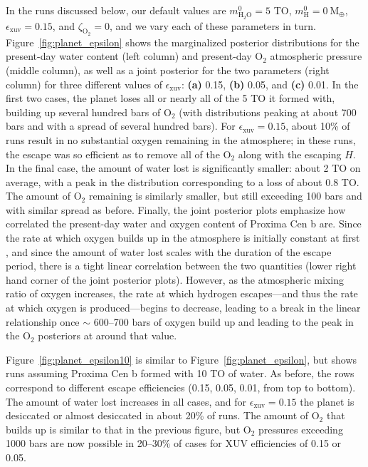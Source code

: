 \documentclass[]{emulateapj}
\begin{document}
In the runs discussed below, our default values are $m_\mathrm{H_2O}^0 = 5$ TO, $m_\mathrm{H}^0 = 0\ \mathrm{M_\oplus}$,
$\epsilon_\mathrm{xuv} = 0.15$, and $\zeta_\mathrm{O_2} = 0$, and we vary each of these parameters in turn. 
Figure~\ref{fig:planet_epsilon} shows the marginalized posterior distributions for the present-day water content (left column)
and present-day O$_2$ atmospheric pressure (middle column), as well as a joint posterior for the two parameters (right column)
for three different values of $\epsilon_\mathrm{xuv}$: \textbf{(a)} 0.15, \textbf{(b)} 0.05, and \textbf{(c)} 0.01. In the first
two cases, the planet loses all or nearly all of the 5 TO it formed with, building up several hundred bars of O$_2$ (with
distributions peaking at about 700 bars and with a spread of several hundred bars). For $\epsilon_\mathrm{xuv} = 0.15$, about
10\% of runs result in no substantial oxygen remaining in the atmosphere; in these runs, the escape was so efficient as to
remove all of the O$_2$ along with the escaping $H$. In the final case, the amount of water lost is significantly smaller:
about 2 TO on average, with a peak in the distribution corresponding to a loss of about 0.8 TO. The amount of O$_2$
remaining is similarly smaller, but still exceeding 100 bars and with similar spread as before. Finally, the joint posterior
plots emphasize how correlated the present-day water and oxygen content of Proxima Cen b are. Since the rate at which
oxygen builds up in the atmosphere is initially constant at first \citep{LugerBarnes15}, and since the amount of water
lost scales with the duration of the escape period, there is a tight linear correlation between the two quantities
(lower right hand corner of the joint posterior plots). However, as the atmospheric mixing ratio of oxygen increases,
the rate at which hydrogen escapes---and thus the rate at which oxygen is produced---begins to decrease, leading to a break
in the linear relationship once $\sim$ 600--700 bars of oxygen build up and leading to the peak in the O$_2$ posteriors
at around that value.

Figure~\ref{fig:planet_epsilon10} is similar to Figure~\ref{fig:planet_epsilon}, but shows runs assuming Proxima Cen b
formed with 10 TO of water. As before, the rows correspond to different escape efficiencies (0.15, 0.05, 0.01, from top
to bottom). The amount of water lost increases in all cases, and for $\epsilon_\mathrm{xuv} = 0.15$ the planet is
desiccated or almost desiccated in about 20\% of runs. The amount of O$_2$ that builds up is similar to that in the
previous figure, but O$_2$ pressures exceeding 1000 bars are now possible in 20--30\% of cases for XUV efficiencies of 0.15
or 0.05.
\end{document}

